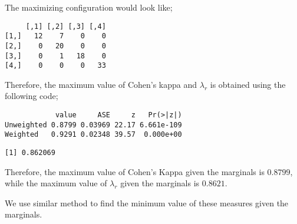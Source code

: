 \documentclass[]{article}
\newenvironment{Shaded}{\begin{snugshade}}{\end{snugshade}}
\newcommand{\KeywordTok}[1]{\textcolor[rgb]{0.13,0.29,0.53}{\textbf{#1}}}
\newcommand{\DecValTok}[1]{\textcolor[rgb]{0.00,0.00,0.81}{#1}}
\newcommand{\StringTok}[1]{\textcolor[rgb]{0.31,0.60,0.02}{#1}}
\newcommand{\OperatorTok}[1]{\textcolor[rgb]{0.81,0.36,0.00}{\textbf{#1}}}
\newcommand{\NormalTok}[1]{#1}
\begin{document}
The maximizing configuration would look like;

\begin{Shaded}
\end{Shaded}

\begin{verbatim}
     [,1] [,2] [,3] [,4]
[1,]   12    7    0    0
[2,]    0   20    0    0
[3,]    0    1   18    0
[4,]    0    0    0   33
\end{verbatim}

Therefore, the maximum value of Cohen's kappa and \(\lambda_r\) is
obtained using the following code;

\begin{Shaded}
\end{Shaded}

\begin{verbatim}
            value     ASE     z   Pr(>|z|)
Unweighted 0.8799 0.03969 22.17 6.661e-109
Weighted   0.9291 0.02348 39.57  0.000e+00
\end{verbatim}

\begin{Shaded}
\end{Shaded}

\begin{verbatim}
[1] 0.862069
\end{verbatim}

Therefore, the maximum value of Cohen's Kappa given the marginals is
\(0.8799\), while the maximum value of \(\lambda_r\) given the marginals
is \(0.8621\).

We use similar method to find the minimum value of these measures given
the marginals.
\end{document}

